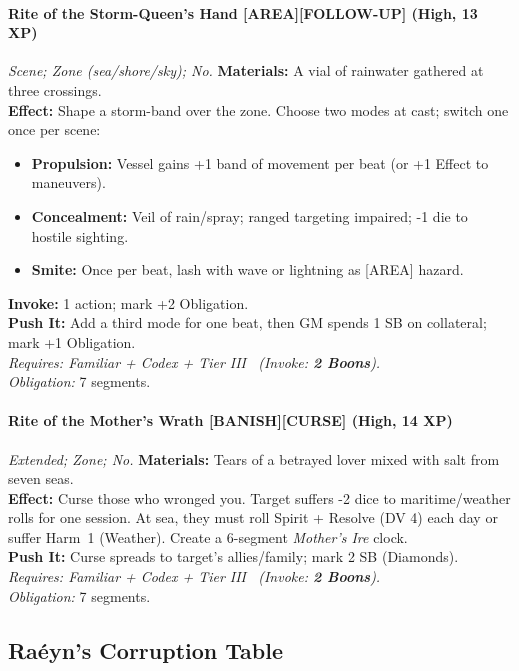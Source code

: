 \paragraph{Rite of the Storm-Queen's Hand \textnormal{[AREA][FOLLOW-UP]} (High, 13 XP)} \emph{Scene; Zone (sea/shore/sky); No.}
\textbf{Materials:} A vial of rainwater gathered at three crossings.\\
\textbf{Effect:} Shape a storm-band over the zone. Choose two modes at cast; switch one once per scene:
\begin{itemize}
\item \textbf{Propulsion:} Vessel gains +1 band of movement per beat (or +1 Effect to maneuvers).
\item \textbf{Concealment:} Veil of rain/spray; ranged targeting impaired; -1 die to hostile sighting.
\item \textbf{Smite:} Once per beat, lash with wave or lightning as [AREA] hazard.
\end{itemize}
\textbf{Invoke:} 1 action; mark +2 Obligation.\\
\textbf{Push It:} Add a third mode for one beat, then GM spends 1 SB on collateral; mark +1 Obligation.\\
\emph{Requires: Familiar + Codex + Tier III \ (\textit{Invoke:} \textbf{2 Boons}).}\\
\emph{Obligation:} 7 segments.

\paragraph{Rite of the Mother's Wrath \textnormal{[BANISH][CURSE]} (High, 14 XP)} \emph{Extended; Zone; No.}
\textbf{Materials:} Tears of a betrayed lover mixed with salt from seven seas.\\
\textbf{Effect:} Curse those who wronged you. Target suffers -2 dice to maritime/weather rolls for one session. At sea, they must roll Spirit + Resolve (DV 4) each day or suffer Harm~1 (Weather). Create a 6-segment \emph{Mother's Ire} clock.\\
\textbf{Push It:} Curse spreads to target's allies/family; mark 2 SB (Diamonds).\\
\emph{Requires: Familiar + Codex + Tier III \ (\textit{Invoke:} \textbf{2 Boons}).}\\
\emph{Obligation:} 7 segments.

\subsection*{Raéyn's Corruption Table}
\label{sec:raeyn-corruption}

